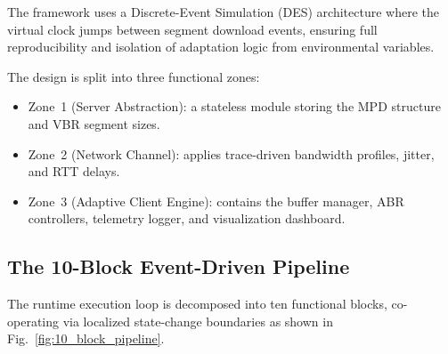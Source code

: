 \documentclass[conference]{IEEEtran}
\begin{document}
The framework uses a Discrete-Event Simulation (DES) architecture where the
virtual clock jumps between segment download events, ensuring full
reproducibility and isolation of adaptation logic from environmental
variables.

The design is split into three functional zones:
\begin{itemize}
  \item Zone~1 (Server Abstraction): a stateless module storing the MPD
    structure and VBR segment sizes.
  \item Zone~2 (Network Channel): applies trace-driven bandwidth profiles,
    jitter, and RTT delays.
  \item Zone~3 (Adaptive Client Engine): contains the buffer manager, ABR
    controllers, telemetry logger, and visualization dashboard.
\end{itemize}

\subsection{The 10-Block Event-Driven Pipeline}

The runtime execution loop is decomposed into ten functional blocks,
co-operating via localized state-change boundaries as shown in
Fig.~\ref{fig:10_block_pipeline}.
\end{document}
